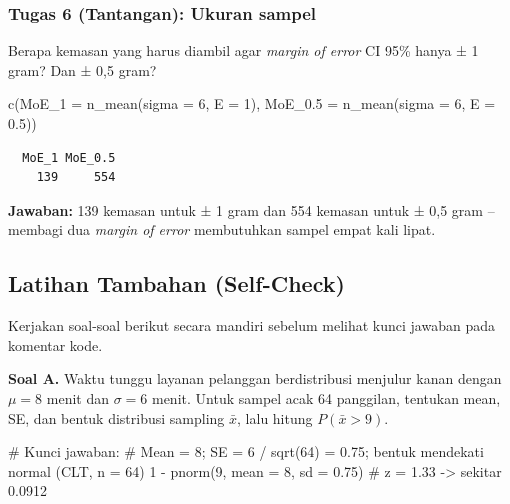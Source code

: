 \documentclass[
  indonesian,
  letterpaper,
]{book}
\newenvironment{Shaded}{\begin{snugshade}}{\end{snugshade}}
\newcommand{\AttributeTok}[1]{\textcolor[rgb]{0.40,0.45,0.13}{#1}}
\newcommand{\CommentTok}[1]{\textcolor[rgb]{0.37,0.37,0.37}{#1}}
\newcommand{\DecValTok}[1]{\textcolor[rgb]{0.68,0.00,0.00}{#1}}
\newcommand{\FloatTok}[1]{\textcolor[rgb]{0.68,0.00,0.00}{#1}}
\newcommand{\FunctionTok}[1]{\textcolor[rgb]{0.28,0.35,0.67}{#1}}
\newcommand{\NormalTok}[1]{\textcolor[rgb]{0.00,0.23,0.31}{#1}}
\newcommand{\SpecialCharTok}[1]{\textcolor[rgb]{0.37,0.37,0.37}{#1}}
\begin{document}
\subsubsection{Tugas 6 (Tantangan): Ukuran
sampel}\label{tugas-6-tantangan-ukuran-sampel}

Berapa kemasan yang harus diambil agar \emph{margin of error} CI 95\%
hanya ± 1 gram? Dan ± 0,5 gram?

\begin{Shaded}
\begin{Highlighting}[]
\FunctionTok{c}\NormalTok{(}\AttributeTok{MoE\_1 =} \FunctionTok{n\_mean}\NormalTok{(}\AttributeTok{sigma =} \DecValTok{6}\NormalTok{, }\AttributeTok{E =} \DecValTok{1}\NormalTok{), }\AttributeTok{MoE\_0.5 =} \FunctionTok{n\_mean}\NormalTok{(}\AttributeTok{sigma =} \DecValTok{6}\NormalTok{, }\AttributeTok{E =} \FloatTok{0.5}\NormalTok{))}
\end{Highlighting}
\end{Shaded}

\begin{verbatim}
  MoE_1 MoE_0.5 
    139     554 
\end{verbatim}

\textbf{Jawaban:} 139 kemasan untuk ± 1 gram dan 554 kemasan untuk ± 0,5
gram -- membagi dua \emph{margin of error} membutuhkan sampel empat kali
lipat.

\subsection{Latihan Tambahan
(Self-Check)}\label{latihan-tambahan-self-check}

Kerjakan soal-soal berikut secara mandiri sebelum melihat kunci jawaban
pada komentar kode.

\textbf{Soal A.} Waktu tunggu layanan pelanggan berdistribusi menjulur
kanan dengan \(\mu = 8\) menit dan \(\sigma = 6\) menit. Untuk sampel
acak 64 panggilan, tentukan mean, SE, dan bentuk distribusi sampling
\(\bar{x}\), lalu hitung \(P(\bar{x} > 9)\).

\begin{Shaded}
\begin{Highlighting}[]
\CommentTok{\# Kunci jawaban:}
\CommentTok{\# Mean = 8; SE = 6 / sqrt(64) = 0.75; bentuk mendekati normal (CLT, n = 64)}
\DecValTok{1} \SpecialCharTok{{-}} \FunctionTok{pnorm}\NormalTok{(}\DecValTok{9}\NormalTok{, }\AttributeTok{mean =} \DecValTok{8}\NormalTok{, }\AttributeTok{sd =} \FloatTok{0.75}\NormalTok{)   }\CommentTok{\# z = 1.33 {-}\textgreater{} sekitar 0.0912}
\end{Highlighting}
\end{Shaded}
\end{document}
